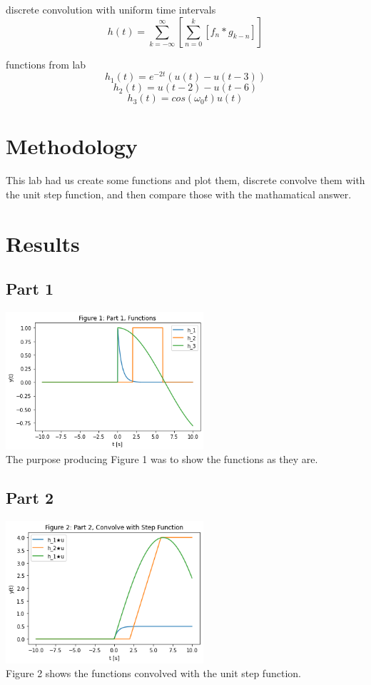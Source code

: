 \documentclass[12pt,a4paper]{article}
\begin{document}
discrete convolution with uniform time intervals
\[h(t) = \sum_{k=-\infty}^{\infty} {\left [ \sum_{n=0}^{k} {\left [ f_n*g_{k-n}\right ]} \right ]}\]

functions from lab
\[h_1(t) = e^{-2t}(u(t)-u(t-3))\]
\[h_2(t) = u(t-2)-u(t-6)\]
\[h_3(t) = cos(\omega_0 t)u(t)\]


\section{Methodology}\label{sec:meth}
This lab had us create some functions and plot them, discrete convolve them with the unit step function, and then compare those with the mathamatical answer.

\section{Results}\label{sec:res}
\subsection*{Part 1}

\includegraphics[width=0.55\textwidth]{Figure1.png}\\
The purpose producing Figure 1 was to show the functions as they are.

\subsection*{Part 2}
\includegraphics[width=0.55\textwidth]{Figure2.png}\\
Figure 2 shows the functions convolved with the unit step function.\\
\end{document}
